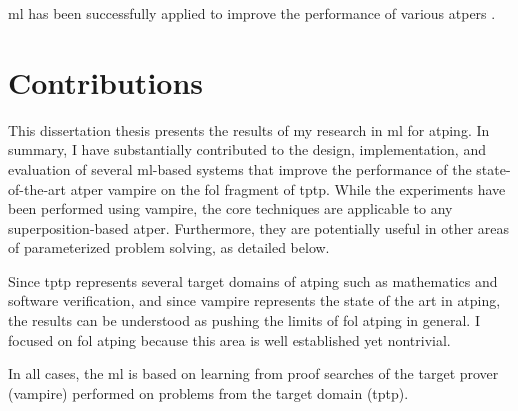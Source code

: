 
\Gls{ml} has been successfully applied to improve the performance of various \glspl{atper} \cite{DBLP:journals/corr/abs-2403-04017}.



\section{Contributions}

This dissertation thesis presents the results of my research in \gls{ml} for \gls{atping}.
In summary, I have substantially contributed to the design, implementation, and evaluation of several \acrshort{ml}-based systems that improve the performance of the state-of-the-art \gls{atper} \gls{vampire} on the \gls{fol} fragment of \gls{tptp}.
While the experiments have been performed using \gls{vampire},
the core techniques are applicable to any \gls{superposition}-based \gls{atper}.
Furthermore, they are potentially useful in other areas of parameterized problem solving, as detailed below.

Since \gls{tptp} represents several target domains of \gls{atping}
such as mathematics and software verification,
and since \gls{vampire} represents the state of the art in \gls{atping},
the results can be understood as pushing the limits of \gls{fol} \gls{atping} in general.
I focused on \gls{fol} \gls{atping} because this area is well established yet nontrivial.

In all cases, the \gls{ml} is based on learning from proof searches of the target prover (\gls{vampire}) performed on problems from the target domain (\gls{tptp}).

